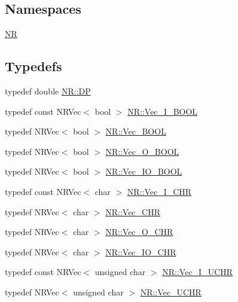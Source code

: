 \subsection*{Namespaces}
\begin{DoxyCompactItemize}
\item 
 \mbox{\hyperlink{namespaceNR}{NR}}
\end{DoxyCompactItemize}
\subsection*{Typedefs}
\begin{DoxyCompactItemize}
\item 
typedef double \mbox{\hyperlink{namespaceNR_af6ff762dd605ff477b8e52387253a02a}{N\+R\+::\+DP}}
\item 
typedef const N\+R\+Vec$<$ bool $>$ \mbox{\hyperlink{namespaceNR_a70331f3de2cf735819b5719e4048d7f3}{N\+R\+::\+Vec\+\_\+\+I\+\_\+\+B\+O\+OL}}
\item 
typedef N\+R\+Vec$<$ bool $>$ \mbox{\hyperlink{namespaceNR_a724646cb87fce7f489384b9a113515fd}{N\+R\+::\+Vec\+\_\+\+B\+O\+OL}}
\item 
typedef N\+R\+Vec$<$ bool $>$ \mbox{\hyperlink{namespaceNR_a7978b7ffdafb07629b4165a7be29d1d5}{N\+R\+::\+Vec\+\_\+\+O\+\_\+\+B\+O\+OL}}
\item 
typedef N\+R\+Vec$<$ bool $>$ \mbox{\hyperlink{namespaceNR_ab48f823aa1c29bd5b75b57ca8b6f7eb5}{N\+R\+::\+Vec\+\_\+\+I\+O\+\_\+\+B\+O\+OL}}
\item 
typedef const N\+R\+Vec$<$ char $>$ \mbox{\hyperlink{namespaceNR_a7083dedcad2ce48148f379b9937b1a30}{N\+R\+::\+Vec\+\_\+\+I\+\_\+\+C\+HR}}
\item 
typedef N\+R\+Vec$<$ char $>$ \mbox{\hyperlink{namespaceNR_a8bdd7b71b3ea3283f23eed0cfabaf38c}{N\+R\+::\+Vec\+\_\+\+C\+HR}}
\item 
typedef N\+R\+Vec$<$ char $>$ \mbox{\hyperlink{namespaceNR_a12f1014df3e5efa305fbf80c51c707b5}{N\+R\+::\+Vec\+\_\+\+O\+\_\+\+C\+HR}}
\item 
typedef N\+R\+Vec$<$ char $>$ \mbox{\hyperlink{namespaceNR_a7486678c75d124d88a5ad22efbcd737e}{N\+R\+::\+Vec\+\_\+\+I\+O\+\_\+\+C\+HR}}
\item 
typedef const N\+R\+Vec$<$ unsigned char $>$ \mbox{\hyperlink{namespaceNR_ace0fbcd7daadfbf5e4e7db2a317a5b46}{N\+R\+::\+Vec\+\_\+\+I\+\_\+\+U\+C\+HR}}
\item 
typedef N\+R\+Vec$<$ unsigned char $>$ \mbox{\hyperlink{namespaceNR_a75ba1edf4fe4133a3ecb94b7c1a90f20}{N\+R\+::\+Vec\+\_\+\+U\+C\+HR}}

\end{DoxyCompactItemize}
